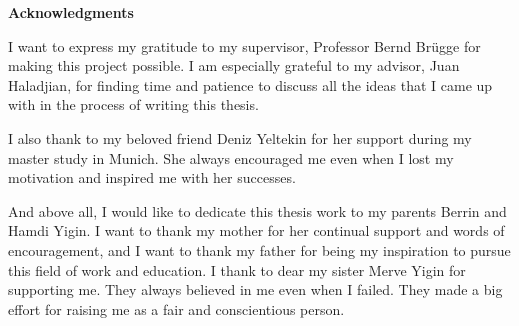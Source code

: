 \clearemptydoublepage
{}
{}	



\vspace*{2cm}

\begin{center}
{\Large \bf Acknowledgments}
\end{center}

\vspace{1cm}


I want to express my gratitude to my supervisor, Professor Bernd Br\"ugge for making this project possible. I am especially grateful to my advisor, Juan Haladjian, for finding time and patience to discuss all the ideas that I came up with in the process of writing this thesis.
\vspace{1cm}

I also thank to my beloved friend Deniz Yeltekin for her support during my master study in Munich. She always encouraged me even when I lost my motivation and inspired me with her successes.
\vspace{1cm}

And above all, I would like to dedicate this thesis work to my parents Berrin and Hamdi Yigin. I want to thank my mother for her continual support and words of encouragement, and I want to thank my father for being my inspiration to pursue this field of work and education. I thank to dear my sister Merve Yigin for supporting me. They always believed in me even when I failed. They made a big effort for raising me as a fair and conscientious person.